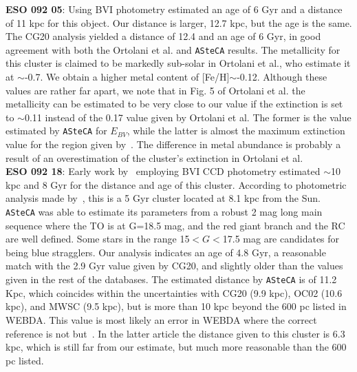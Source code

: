 \documentclass{aa}
\begin{document}
\begin{appendix}
  \noindent \textbf{ESO 092 05}: Using BVI photometry \cite{Ortolani_2008} estimated
  an age of 6 Gyr and a distance of 11 kpc for this object. Our distance is
  larger, 12.7 kpc, but the age is the same.
  The CG20 analysis yielded a distance of 12.4 and an age of 6 Gyr, in good
  agreement with both the  Ortolani et al. and \texttt{ASteCA} results.
  The metallicity for this cluster is claimed to be markedly sub-solar in
  Ortolani et al., who estimate it at $\sim$-0.7. We obtain a
  higher metal content of [Fe/H]$\sim$-0.12. Although these values are rather far
  apart, we note that in Fig. 5 of Ortolani et al. the metallicity can be
  estimated to be very close to our value if the extinction is set to
  $\sim$0.11 instead of the 0.17 value given by Ortolani et al. The former is
  the value estimated by \texttt{ASteCA} for $E_{BV}$, while the latter
  is almost the maximum extinction value for the region given
  by~\cite{Schlafly_2011}. The difference in metal abundance is probably a
  result of an overestimation of the cluster's extinction in Ortolani et al.\\

  \noindent \textbf{ESO 092 18}: Early work by~\cite{Kubiak_1991} employing BVI CCD
  photometry estimated $\sim$10 kpc and 8 Gyr for the distance and age of this
  cluster.
  According to photometric analysis made by~\cite{Carraro1995}, this is a 5 Gyr
  cluster located at 8.1 kpc from the Sun.
  \texttt{ASteCA} was able to estimate its parameters from a robust 2 mag long
  main sequence where the TO is at G=18.5 mag, and the red giant branch and the
  RC are well defined. Some stars in the range 15$<G<$17.5 mag are candidates for
  being blue stragglers.
  Our analysis indicates an age of 4.8 Gyr, a reasonable match with the 2.9 Gyr
  value given by CG20, and slightly older than the values given in the rest of
  the databases. The estimated distance by \texttt{ASteCA} is of 11.2 Kpc, which
  coincides within the uncertainties with CG20 (9.9 kpc), OC02 (10.6 kpc), and
  MWSC (9.5 kpc), but is more than 10 kpc beyond the 600 pc listed in WEBDA.
  This value is most likely an error in WEBDA where the correct reference is
  not \cite{Phelps_1994_develop} but~\cite{Janes_1994}. In the latter article
  the distance given to this cluster is 6.3 kpc, which is still far from our
  estimate, but much more reasonable than the 600 pc listed.\\


\end{appendix}
\end{document}
